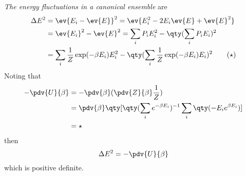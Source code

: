 \emph{The energy fluctuations in a canonical ensemble} are
\begin{align*} 
\Delta E^2 &= \ev{E_i - \ev{E}}^2 = \ev{E_i^2 - 2 E_i \ev{E} + \ev{E}^2} \\
 &= \ev{E_i}^2 - \ev{E}^2 = \sum_i P_i E_i^2 - \qty( \sum_i P_i E_i )^2 \\
 &= \sum_i \frac{1}{Z} \exp(-\beta E_i) E_i^2 - \qty( \sum_i \frac{1}{Z} \exp(- \beta E_i) E_i )^2 \tag{\(\star\)}
\end{align*}
Noting that 
\begin{align*}
  - \pdv{U}{\beta} &= - \pdv{\beta}( \pdv{Z}{\beta} \frac{1}{Z} ) \\ 
&= \pdv{\beta} \qty[ \qty(\sum_i e^{-\beta E_i})^{-1} \sum_i \qty(-E_i e^{\beta E_i})] \\
&= \star
\end{align*}
then
\begin{equation}
  \label{eq:13}
  \Delta E^2 = - \pdv{U}{\beta}
\end{equation}
which is positive definite.


